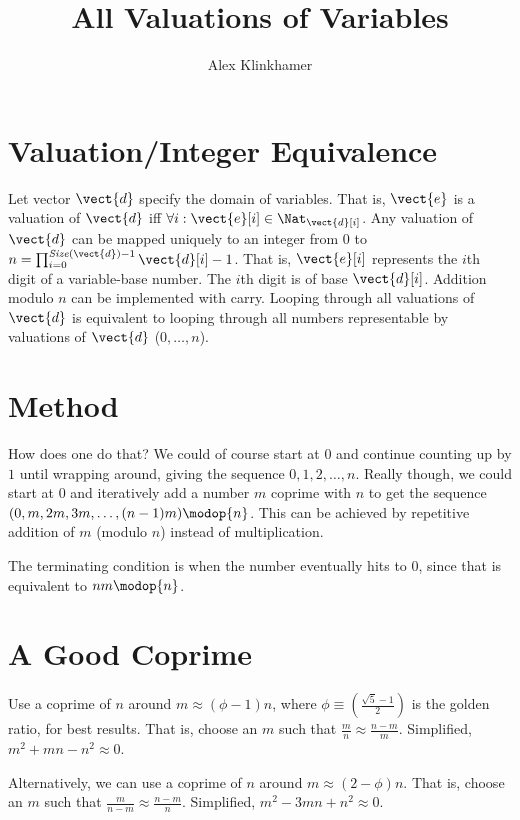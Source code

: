 



\title{All Valuations of Variables}
\author{Alex Klinkhamer}
\maketitle

\section{Valuation/Integer Equivalence}

Let vector $\vect{d}$ specify the domain of variables.
That is, $\vect{e}$ is a valuation of $\vect{d}$ iff $\forall i: \vect{e}[i]\in\Nat_{\vect{d}[i]}$.
Any valuation of $\vect{d}$ can be mapped uniquely to an integer from $0$ to $n=\prod_{i=0}^{\mathit{Size}(\vect{d})-1} \vect{d}[i]-1$.
That is, $\vect{e}[i]$ represents the $i$th digit of a variable-base number.
The $i$th digit is of base $\vect{d}[i]$.
Addition modulo $n$ can be implemented with carry.
Looping through all valuations of $\vect{d}$ is equivalent to looping through all numbers representable by valuations of $\vect{d}$ ($0,\dots,n$).

\section{Method}
How does one do that?
We could of course start at $0$ and continue counting up by $1$ until wrapping around, giving the sequence $0,1,2,\dots,n$.
Really though, we could start at $0$ and iteratively add a number $m$ coprime with $n$ to get the sequence $(0,m,2m,3m,\dots,(n-1)m)\modop{n}$.
This can be achieved by repetitive addition of $m$ (modulo $n$) instead of multiplication.

The terminating condition is when the number eventually hits to $0$, since that is equivalent to $n m\modop{n}$.

\section{A Good Coprime}

Use a coprime of $n$ around $m\approx(\phi-1)n$, where $\phi\equiv (\frac{\sqrt{5}-1}{2})$ is the golden ratio, for best results.
That is, choose an $m$ such that $\frac{m}{n}\approx\frac{n-m}{m}$.
Simplified, $m^2+mn-n^2\approx 0$.

Alternatively, we can use a coprime of $n$ around $m\approx(2-\phi)n$.
That is, choose an $m$ such that $\frac{m}{n-m}\approx\frac{n-m}{n}$.
Simplified, $m^2-3mn+n^2\approx 0$.

